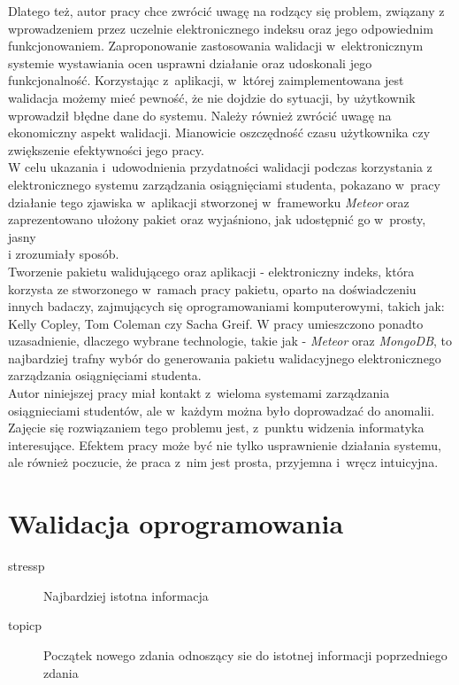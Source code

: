 \documentclass[brudnopis]{xmgr}
\begin{document}
\textcolor{wc}{Dlatego też, autor pracy chce zwrócić uwagę na rodzący się problem, związany
z wprowadzeniem przez uczelnie elektronicznego indeksu oraz jego odpowiednim
funkcjonowaniem. Zaproponowanie zastosowania walidacji w~elektronicznym systemie
wystawiania ocen usprawni działanie oraz udoskonali jego funkcjonalność.
Korzystając z~aplikacji, w~której zaimplementowana jest walidacja możemy mieć pewność,
że nie dojdzie do sytuacji, by użytkownik wprowadził błędne dane do systemu.
Należy również zwrócić uwagę na ekonomiczny aspekt walidacji. Mianowicie oszczędność
czasu użytkownika czy zwiększenie efektywności jego pracy.}
\\
\indent \textcolor{wc}{W celu ukazania i~udowodnienia przydatności walidacji podczas korzystania
z elektronicznego systemu zarządzania osiągnięciami studenta, pokazano w~pracy
działanie tego zjawiska w~aplikacji stworzonej w~frameworku \textit{Meteor} oraz
zaprezentowano ułożony pakiet oraz wyjaśniono, jak udostępnić go w~prosty, jasny
\\
i zrozumiały sposób.}
\\
\indent \textcolor{wd}{Tworzenie pakietu walidującego oraz aplikacji - elektroniczny indeks, która korzysta
ze stworzonego w~ramach pracy pakietu, oparto na doświadczeniu innych badaczy,
zajmujących się oprogramowaniami komputerowymi, takich jak: Kelly Copley, Tom
Coleman czy Sacha Greif.} \textcolor{wa}{W pracy umieszczono ponadto uzasadnienie, dlaczego wybrane
technologie, takie jak - \textit{Meteor} oraz \textit{MongoDB}, to najbardziej trafny wybór do generowania
pakietu walidacyjnego elektronicznego zarządzania osiągnięciami studenta.}
\\
\indent \textcolor{wa}{Autor niniejszej pracy miał kontakt z~wieloma systemami zarządzania osiągnieciami
studentów, ale w~każdym można było doprowadzać do anomalii. Zajęcie się rozwiązaniem
tego problemu jest, z~punktu widzenia informatyka interesujące. Efektem pracy może być
nie tylko usprawnienie działania systemu, ale również poczucie, że praca z~nim jest
prosta, przyjemna i~wręcz intuicyjna.}





\chapter{Walidacja oprogramowania}

\begin{description}
\item[stressp] \textcolor{sa}{Najbardziej istotna informacja}
\item[topicp] \textcolor{sb}{Początek nowego zdania odnoszący sie do istotnej informacji poprzedniego zdania}
\end{description}
\end{document}
